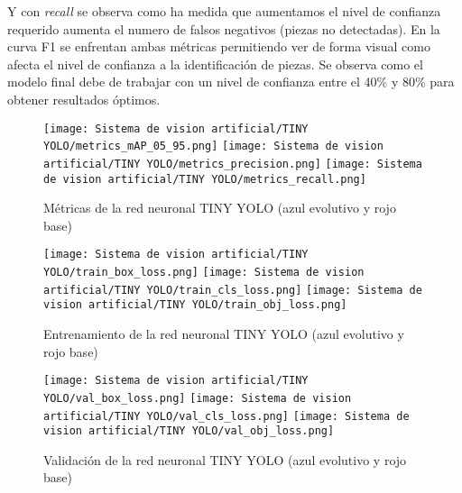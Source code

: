 Y con \textit{recall} se observa como ha medida que aumentamos el nivel de confianza requerido aumenta el numero de falsos negativos (piezas no detectadas). En la curva F1 se enfrentan ambas métricas permitiendo ver de forma visual como afecta el nivel de confianza a la identificación de piezas. Se observa como el modelo final debe de trabajar con un nivel de confianza entre el 40\% y 80\% para obtener resultados óptimos.

\begin{figure}[H]
	\centering
    \texttt{[image: Sistema de vision artificial/TINY YOLO/metrics\_mAP\_05\_95.png]} \hfill
    \texttt{[image: Sistema de vision artificial/TINY YOLO/metrics\_precision.png]} \hfill
    \texttt{[image: Sistema de vision artificial/TINY YOLO/metrics\_recall.png]}
	\caption[Métricas de la red neuronal TINY YOLO \textit{(mAP 0.5:0.95, precision \& recall)}]{Métricas de la red neuronal TINY YOLO (azul evolutivo y rojo base)}
	\label{chap:Sistema de visión artificial fig:TINY YOLO metrics}
\end{figure}

\begin{figure}[H]
	\centering
    \texttt{[image: Sistema de vision artificial/TINY YOLO/train\_box\_loss.png]} \hfill
    \texttt{[image: Sistema de vision artificial/TINY YOLO/train\_cls\_loss.png]} \hfill
    \texttt{[image: Sistema de vision artificial/TINY YOLO/train\_obj\_loss.png]}
	\caption[Entrenamiento de la red neuronal TINY YOLO \textit{(bounding box loss, class loss \& object loss)}]{Entrenamiento de la red neuronal TINY YOLO (azul evolutivo y rojo base)}
	\label{chap:Sistema de visión artificial fig:TINY YOLO train}
\end{figure}

\begin{figure}[H]
	\centering
    \texttt{[image: Sistema de vision artificial/TINY YOLO/val\_box\_loss.png]} \hfill
    \texttt{[image: Sistema de vision artificial/TINY YOLO/val\_cls\_loss.png]} \hfill
    \texttt{[image: Sistema de vision artificial/TINY YOLO/val\_obj\_loss.png]}
	\caption[Validación de la red neuronal TINY YOLO \textit{(bounding box loss, class loss \& object loss)}]{Validación de la red neuronal TINY YOLO (azul evolutivo y rojo base)}
	\label{chap:Sistema de visión artificial fig:TINY YOLO validation}
\end{figure}

